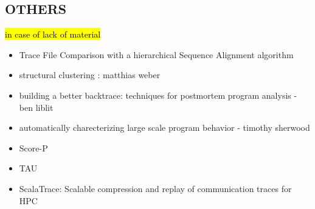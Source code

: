 \subsection{OTHERS}
\hl{in case of lack of material}
\begin{itemize}
\item Trace File Comparison with a hierarchical Sequence Alignment algorithm \cite{weber-seqAlign}
\item structural clustering : matthias weber \cite{weberStructural}
\item building a better backtrace: techniques for postmortem program analysis - ben liblit \cite{liblit02}
\item automatically charecterizing large scale program behavior - timothy sherwood \cite{sherwood02}
\item Score-P \cite{scorep}
\item TAU \cite{tau}
\item ScalaTrace: Scalable compression and replay of communication traces for HPC  \cite{scalatrace}
\end{itemize}






%
%
%
%

